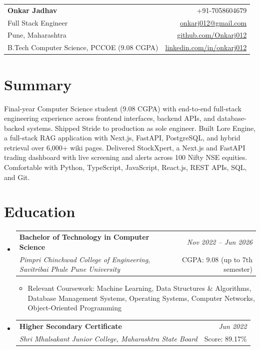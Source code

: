 \documentclass[a4paper,11pt]{article}
\makeatletter
\newcommand{\resumeSubheading}[4]{
\vspace{0.5mm}\item
    \begin{tabular*}{0.98\textwidth}[t]{l@{\extracolsep{\fill}}r}
        \textbf{#1} & \textit{\footnotesize{#4}} \\
        \textit{\footnotesize{#3}} & \footnotesize{#2}\\
    \end{tabular*}
    \vspace{-2.4mm}
}
\newcommand{\resumeSubHeadingListStart}{\begin{itemize}[leftmargin=*,labelsep=0mm]}
\newcommand{\resumeItemListStart}{\begin{justify}\begin{itemize}[leftmargin=3ex, rightmargin=2ex, noitemsep,labelsep=1.2mm,itemsep=0mm]\small}
\newcommand{\resumeSubHeadingListEnd}{\end{itemize}\vspace{2mm}}
\newcommand{\resumeItemListEnd}{\end{itemize}\end{justify}\vspace{-2mm}}
\newcommand{\name}{Onkar Jadhav}
\newcommand{\phone}{7058604679}
\newcommand{\emaila}{onkarj012@gmail.com}
\newcommand{\github}{github.com/Onkarj012}
\newcommand{\linkedin}{linkedin.com/in/onkarj012}
\makeatother
\begin{document}
\selectfont

\begin{tabularx}{\linewidth}{L r}
  \textbf{\Large \name} & {+91-\phone} \\
  {Full Stack Engineer} & \href{mailto:\emaila}{\emaila} \\
  {Pune, Maharashtra} & \href{https://\github}{\github} \\
  {B.Tech Computer Science, PCCOE (9.08 CGPA)} & \href{https://\linkedin}{\linkedin}
\end{tabularx}
\vspace{-4mm}

\section{\textbf{Summary}}
\vspace{1mm}
\small{
Final-year Computer Science student (9.08 CGPA) with end-to-end full-stack engineering experience across frontend interfaces, backend APIs, and database-backed systems. Shipped Stride to production as sole engineer. Built Lore Engine, a full-stack RAG application with Next.js, FastAPI, PostgreSQL, and hybrid retrieval over 6,000+ wiki pages. Delivered StockXpert, a Next.js and FastAPI trading dashboard with live screening and alerts across 100 Nifty NSE equities. Comfortable with Python, TypeScript, JavaScript, React.js, REST APIs, SQL, and Git.
}
\vspace{-3mm}

\section{\textbf{Education}}
  \resumeSubHeadingListStart
    \resumeSubheading
      {Bachelor of Technology in Computer Science}{CGPA: 9.08 (up to 7th semester)}
      {Pimpri Chinchwad College of Engineering, Savitribai Phule Pune University}{Nov 2022 -- Jun 2026}
      \resumeItemListStart
        \item {Relevant Coursework: Machine Learning, Data Structures \& Algorithms, Database Management Systems, Operating Systems, Computer Networks, Object-Oriented Programming}
      \resumeItemListEnd
    \resumeSubheading
      {Higher Secondary Certificate}{Score: 89.17\%}
      {Shri Mhalsakant Junior College, Maharashtra State Board}{Jun 2022}
  \resumeSubHeadingListEnd
\vspace{-5.5mm}
\end{document}
